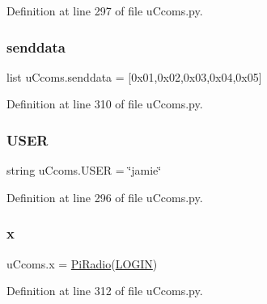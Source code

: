 Definition at line 297 of file u\+Ccoms.\+py.

\mbox{\label{namespaceu_ccoms_a45d75d2afe9d9ddcc718ad8b817756db}} 
\subsubsection{\texorpdfstring{senddata}{senddata}}
{\footnotesize\ttfamily list u\+Ccoms.\+senddata = \mbox{[}0x01,0x02,0x03,0x04,0x05\mbox{]}}



Definition at line 310 of file u\+Ccoms.\+py.

\mbox{\label{namespaceu_ccoms_a300efdcbe8f88bd91a7d1585d7546eed}} 
\subsubsection{\texorpdfstring{USER}{USER}}
{\footnotesize\ttfamily string u\+Ccoms.\+U\+S\+ER = \char`\"{}jamie\char`\"{}}



Definition at line 296 of file u\+Ccoms.\+py.

\mbox{\label{namespaceu_ccoms_a60648bb50e391d780fd4d5e546853d19}} 
\subsubsection{\texorpdfstring{x}{x}}
{\footnotesize\ttfamily u\+Ccoms.\+x = \mbox{\hyperlink{classu_ccoms_1_1_pi_radio}{Pi\+Radio}}(\mbox{\hyperlink{namespaceu_ccoms_ae2aa412a23b414e90847ae138987f3a0}{L\+O\+G\+IN}})}



Definition at line 312 of file u\+Ccoms.\+py.

